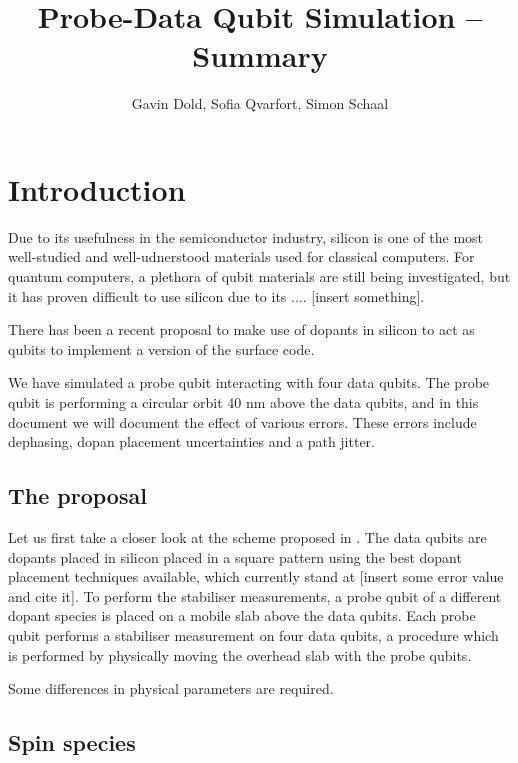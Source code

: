 



\usepackage{geometry}
\geometry{legalpaper, margin=1.0in}


\title{Probe-Data Qubit Simulation -- Summary}
\author{Gavin Dold, Sofia Qvarfort, Simon Schaal}
\maketitle
\tableofcontents
\section{Introduction}
Due to its usefulness in the semiconductor industry, silicon is one of the most well-studied and well-udnerstood materials used for classical computers. For quantum computers, a plethora of qubit materials are still being investigated, but it has proven difficult to use silicon due to its .... [insert something]. 

There has been a recent proposal to make use of dopants in silicon to act as qubits \cite{the paper} to implement a version of the surface code. 


We have simulated a probe qubit interacting with four data qubits. The probe qubit is performing a circular orbit $40$ nm above the data qubits, and in this document we will document the effect of various errors. These errors include dephasing, dopan placement uncertainties and a path jitter. 

\subsection{The proposal}
Let us first take a closer look at the scheme proposed in \cite{the paper}. The data qubits are dopants placed in silicon placed in a square pattern using the best dopant placement techniques available, which currently stand at [insert some error value and cite it]. To perform the stabiliser measurements, a probe qubit of a different dopant species is placed on a mobile slab above the data qubits. Each probe qubit performs a stabiliser measurement on four data qubits, a procedure which is performed by physically moving the overhead slab with the probe qubits. 

Some differences in physical parameters are required. 

\subsection{Spin species}

